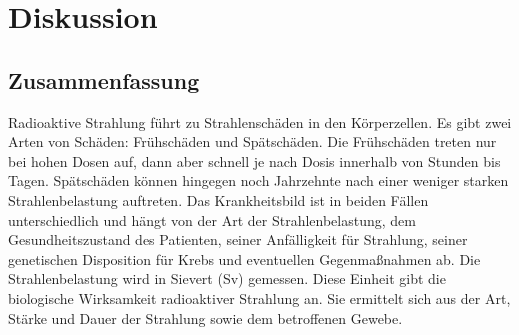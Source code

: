 \chapter{Diskussion}
\label{sec:diskussion}

\section{Zusammenfassung}
\label{sec:überschrift}

Radioaktive Strahlung führt zu Strahlenschäden in den Körperzellen.
Es gibt zwei Arten von Schäden: Frühschäden und Spätschäden.
Die Frühschäden treten nur bei hohen Dosen auf, dann aber schnell je nach Dosis innerhalb von Stunden bis Tagen. Spätschäden können hingegen noch Jahrzehnte nach einer weniger starken Strahlenbelastung auftreten. Das Krankheitsbild ist in beiden Fällen unterschiedlich und hängt von der Art der Strahlenbelastung, dem Gesundheitszustand des Patienten, seiner Anfälligkeit für Strahlung, seiner genetischen Disposition für Krebs und eventuellen Gegenmaßnahmen ab.
Die Strahlenbelastung wird in Sievert (Sv) gemessen. Diese Einheit gibt die biologische Wirksamkeit radioaktiver Strahlung an. Sie ermittelt sich aus der Art, Stärke und Dauer der Strahlung sowie dem betroffenen Gewebe.\\
